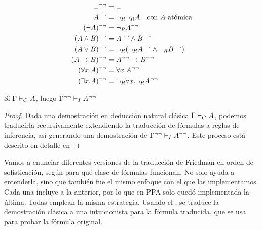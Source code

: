 \begin{definition}
    \begin{align*}
        \bot^{\neg\neg}                         & = \bot                                                             \\
        A^{\neg\neg}                        & = \neg_R\neg_R A
        \quad \text{con $A$ atómica}                                                                              \\
        (\neg A)^{\neg\neg}                & = \neg_R A^{\neg\neg}                                          \\
        (A \wedge B)^{\neg\neg}       & = A^{\neg\neg} \wedge B^{\neg\neg}                     \\
        (A \vee B)^{\neg\neg}        & = \neg_R(\neg_RA^{\neg\neg} \wedge \neg_RB^{\neg\neg}) \\
        (A \rightarrow B)^{\neg\neg} & = A^{\neg\neg} \rightarrow B^{\neg\neg}               \\
        (\forall x . A)^{\neg\neg}          & = \forall x . A^{\neg\neg}                                    \\
        (\exists x . A)^{\neg\neg}          & = \neg_R \forall x . \neg_R A^{\neg\neg}
    \end{align*}
\end{definition}

\begin{theorem}
    \label{fri:thm:dneg-trans-classic-int}
    Si $\Gamma \vdash_C A$, luego $\Gamma^{\neg\neg} \vdash_I A^{\neg\neg}$
\end{theorem}
\begin{proof}
    Dada una demostración en deducción natural clásica $\Gamma \vdash_C A$, podemos traducirla recursivamente extendiendo la traducción de fórmulas a reglas de inferencia, así generando una demostración de $\Gamma^{\neg\neg} \vdash_I A^{\neg\neg}$.
    Este proceso está descrito en detalle en 
\end{proof}

Vamos a enunciar diferentes versiones de la traducción de Friedman en orden de sofisticación, según para qué clase de fórmulas funcionan. No solo ayuda a entenderla, sino que también fue el mismo enfoque con el que las implementamos. Cada una incluye a la anterior, por lo que en PPA solo quedó implementada la última. Todas emplean la misma estrategia. Usando el , se traduce la demostración clásica a una intuicionista para la fórmula traducida, que se usa para probar la fórmula original.


